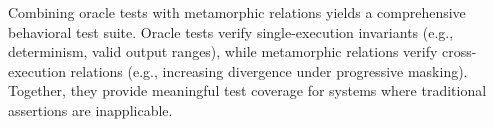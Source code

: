 Combining oracle tests with metamorphic relations yields a comprehensive behavioral test suite. Oracle tests verify single-execution invariants (e.g., determinism, valid output ranges), while metamorphic relations verify cross-execution relations (e.g., increasing divergence under progressive masking). Together, they provide meaningful test coverage for systems where traditional assertions are inapplicable.
